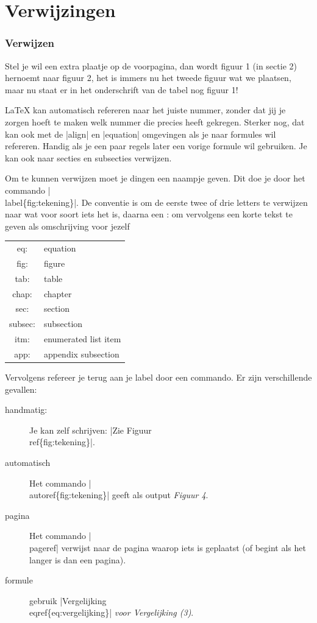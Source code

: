\documentclass{cursuspresentatie}
\begin{document}
\section{Verwijzingen}
\begin{frame}[allowframebreaks]
	\frametitle{Verwijzen}
	Stel je wil een extra plaatje op de voorpagina, dan wordt figuur 1 (in
	sectie 2) hernoemt naar figuur 2, het is immers nu het tweede figuur wat we
	plaatsen, maar nu staat er in het onderschrift van de tabel nog figuur 1!
	
	\LaTeX{} kan automatisch refereren naar het juiste nummer, zonder dat jij je
	zorgen hoeft te maken welk nummer die precies heeft gekregen. Sterker nog,
	dat kan ook met de \hll|align| en \hll|equation| omgevingen als je
	naar formules wil refereren. Handig als je een paar regels later een vorige
	formule wil gebruiken. Je kan ook naar secties en subsecties verwijzen.
	
	\framebreak
	
	Om te kunnen verwijzen moet je dingen een naampje geven. Dit doe je door het
	commando \alert{\hll|\\label\{fig:tekening\}|}. De conventie
	is om de eerste twee of drie letters te verwijzen naar wat voor soort iets
	het is, daarna een : om vervolgens een korte tekst te geven als omschrijving
	voor jezelf
	
	\begin{table}
		\centering
		\small\begin{tabular}{c|l}
			eq:&	equation \\ 
			fig:&	figure \\
			tab:&	table \\
			chap: &	chapter \\
			sec:&	section \\
			subsec:&	subsection \\
			itm:&	enumerated list item \\
			app:&	appendix subsection
		\end{tabular}
	\end{table}

	\framebreak
	Vervolgens refereer je terug aan je label door een commando. Er zijn verschillende gevallen:
	\begin{description}
		\item[handmatig:]
        Je kan zelf schrijven: \hll|Zie Figuur \\ref\{fig:tekening\}|.
		\item[automatisch] Het commando \hll|\\autoref\{fig:tekening\}| geeft als output
        \textit{Figuur 4}. 
		\item[pagina]  Het commando \hll|\\pageref| verwijst naar de pagina
		waarop iets is geplaatst (of begint als het langer is dan een pagina).
		\item[formule] gebruik \hll|Vergelijking \\eqref\{eq:vergelijking\}| \textit{voor Vergelijking (3)}.
	\end{description}
\end{frame}
	
\end{document}
